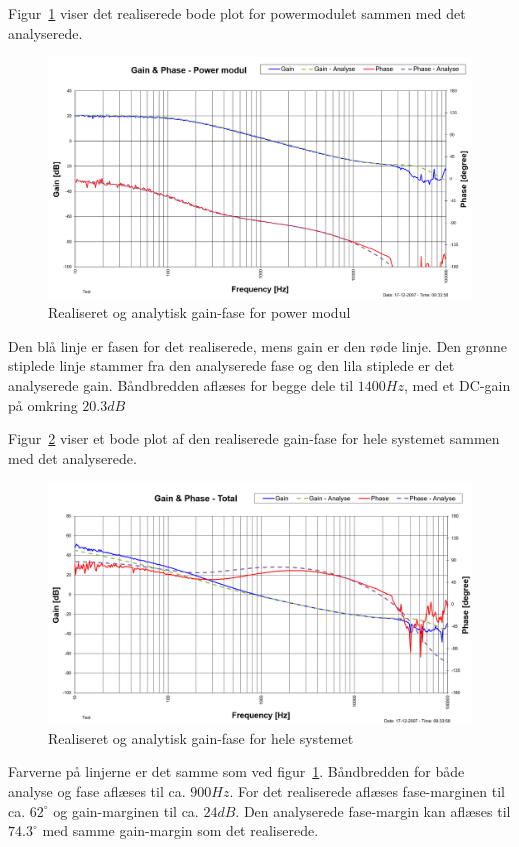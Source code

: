 Figur~\ref{fig:realisering_gain_fase_power} viser det realiserede bode plot for powermodulet sammen med det analyserede.
\begin{figure}[H]
	\center
	\includegraphics[max width=0.7\linewidth]{../dokumentation/tex/2iteration/billeder/Realisering/Realisering_gain_fase_power.png}
	\caption{Realiseret og analytisk gain-fase for power modul}
	\label{fig:realisering_gain_fase_power}
\end{figure}
Den blå linje er fasen for det realiserede, mens gain er den røde linje. Den grønne stiplede linje stammer fra den analyserede fase og den lila stiplede er det analyserede gain. Båndbredden aflæses for begge dele til $1400Hz$, med et DC-gain på omkring $20.3dB$

Figur~\ref{fig:realisering_gain_fase_tot} viser et bode plot af den realiserede gain-fase for hele systemet sammen med det analyserede.
\begin{figure}[H]
	\center
	\includegraphics[max width=0.7\linewidth]{../dokumentation/tex/2iteration/billeder/Realisering/Realisering_gain_fase_tot.png}
	\caption{Realiseret og analytisk gain-fase for hele systemet}
	\label{fig:realisering_gain_fase_tot}
\end{figure}
Farverne på linjerne er det samme som ved figur~\ref{fig:realisering_gain_fase_power}. Båndbredden for både analyse og fase aflæses til ca. $900Hz$. For det realiserede aflæses fase-marginen til ca. $62^\circ$ og gain-marginen til ca. $24dB$. Den analyserede fase-margin kan aflæses til $74.3^\circ$ med samme gain-margin som det realiserede.

